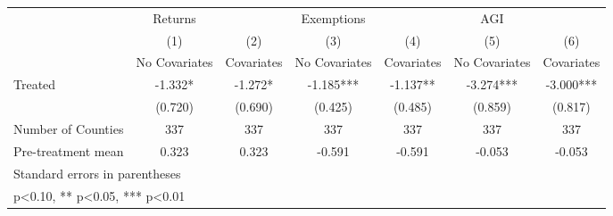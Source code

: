 {
\def\sym#1{\ifmmode^{#1}\else\(^{#1}\)\fi}
\begin{tabular}{l*{6}{c}}
\hline\hline
            &     Returns   &               &  Exemptions   &               &         AGI   &               \\
            &\multicolumn{1}{c}{(1)}&\multicolumn{1}{c}{(2)}&\multicolumn{1}{c}{(3)}&\multicolumn{1}{c}{(4)}&\multicolumn{1}{c}{(5)}&\multicolumn{1}{c}{(6)}\\
            &\multicolumn{1}{c}{No Covariates}&\multicolumn{1}{c}{Covariates}&\multicolumn{1}{c}{No Covariates}&\multicolumn{1}{c}{Covariates}&\multicolumn{1}{c}{No Covariates}&\multicolumn{1}{c}{Covariates}\\
\hline
Treated     &      -1.332*  &      -1.272*  &      -1.185***&      -1.137** &      -3.274***&      -3.000***\\
            &     (0.720)   &     (0.690)   &     (0.425)   &     (0.485)   &     (0.859)   &     (0.817)   \\
\hline
Number of Counties&         337   &         337   &         337   &         337   &         337   &         337   \\
Pre-treatment mean&       0.323   &       0.323   &      -0.591   &      -0.591   &      -0.053   &      -0.053   \\
\hline\hline
\multicolumn{7}{l}{\footnotesize Standard errors in parentheses}\\
\multicolumn{7}{l}{\footnotesize * p<0.10, ** p<0.05, *** p<0.01}\\
\end{tabular}
}
